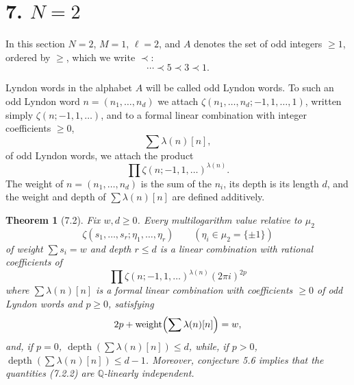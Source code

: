 \documentclass[10pt,a4paper]{article}
\newcommand{\Q}{\mathbb Q}
\theoremstyle{deligne}
\newtheorem*{theorem*}{Theorem}
\newcommand{\heading}[1]{\vspace{0.65em}\noindent{\bfseries #1}\quad}
\begin{document}
\section*{7. \(N=2\)}

In this section \(N=2\), \(M=1\), \(\ell=2\), and \(A\) denotes the set of odd integers \(\ge1\), ordered by \(\ge\), which we write \(\prec\):
\[
\cdots\prec5\prec3\prec1.
\]

\heading{7.1.} Lyndon words in the alphabet \(A\) will be called odd Lyndon words. To such an odd Lyndon word \(n=(n_1,\ldots,n_d)\) we attach \(\zeta(n_1,\ldots,n_d;-1,1,\ldots,1)\), written simply \(\zeta(n;-1,1,\ldots)\), and to a formal linear combination with integer coefficients \(\ge0\),
\[
\sum\lambda(n)[n],
\]
of odd Lyndon words, we attach the product
\[
\prod\zeta(n;-1,1,\ldots)^{\lambda(n)}.
\]
The weight of \(n=(n_1,\ldots,n_d)\) is the sum of the \(n_i\), its depth is its length \(d\), and the weight and depth of \(\sum\lambda(n)[n]\) are defined additively.

\begin{theorem*}[7.2]
Fix \(w,d\ge0\). Every multilogarithm value relative to \(\mu_2\)
\[
\tag{7.2.1}
\zeta(s_1,\ldots,s_r;\eta_1,\ldots,\eta_r)\qquad(\eta_i\in\mu_2=\{\pm1\})
\]
of weight \(\sum s_i=w\) and depth \(r\le d\) is a linear combination with rational coefficients of
\[
\tag{7.2.2}
\prod\zeta(n;-1,1,\ldots)^{\lambda(n)}(2\pi i)^{2p}
\]
where \(\sum\lambda(n)[n]\) is a formal linear combination with coefficients \(\ge0\) of odd Lyndon words and \(p\ge0\), satisfying
\[
2p+\operatorname{weight}\Bigl(\sum\lambda(n)[n]\Bigr)=w,
\]
and, if \(p=0\), \(\operatorname{depth}(\sum\lambda(n)[n])\le d\), while, if \(p>0\), \(\operatorname{depth}(\sum\lambda(n)[n])\le d-1\). Moreover, conjecture 5.6 implies that the quantities (7.2.2) are \(\Q\)-linearly independent.
\end{theorem*}
\end{document}
